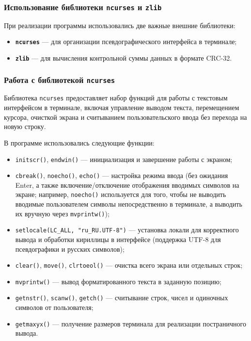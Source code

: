 \subsubsection*{Использование библиотеки \texttt{ncurses} и \texttt{zlib}}

При реализации программы использовались две важные внешние библиотеки:

\begin{itemize}
    \item \textbf{\texttt{ncurses}} — для организации псевдографического интерфейса в терминале;
    \item \textbf{\texttt{zlib}} — для вычисления контрольной суммы данных в формате CRC-32.
\end{itemize}

\subsubsection{Работа с библиотекой \texttt{ncurses}}

Библиотека \texttt{ncurses} предоставляет набор функций для работы с текстовым интерфейсом в терминале, включая управление выводом текста, перемещением курсора, очисткой экрана и считыванием пользовательского ввода без перехода на новую строку.

В программе использовались следующие функции:
\begin{itemize}
    \item \texttt{initscr()}, \texttt{endwin()} — инициализация и завершение работы с экраном;
    \item \texttt{cbreak()}, \texttt{noecho()}, \texttt{echo()} — настройка режима ввода (без ожидания Enter, а также включение/отключение отображения вводимых символов на экране; например, \texttt{noecho()} используется для того, чтобы не выводить вводимые пользователем символы непосредственно в терминале, а выводить их вручную через \texttt{mvprintw()});
    \item \texttt{setlocale(LC\_ALL, "ru\_RU.UTF-8")} — установка локали для корректного вывода и обработки кириллицы в интерфейсе (поддержка UTF-8 для псевдографики и русских символов);
    \item \texttt{clear()}, \texttt{move()}, \texttt{clrtoeol()} — очистка всего экрана или отдельных строк;
    \item \texttt{mvprintw()} — вывод форматированного текста в заданную позицию;
    \item \texttt{getnstr()}, \texttt{scanw()}, \texttt{getch()} — считывание строк, чисел и одиночных символов от пользователя;
    \item \texttt{getmaxyx()} — получение размеров терминала для реализации постраничного вывода.
\end{itemize}

